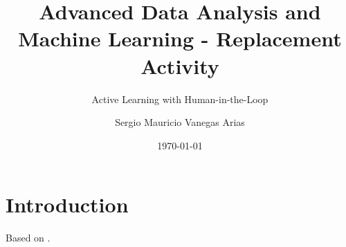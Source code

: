 \documentclass{scrartcl}
\title{Advanced Data Analysis and Machine Learning - Replacement Activity}
\subtitle{Active Learning with Human-in-the-Loop}
\author{Sergio Mauricio Vanegas Arias}
\date{\today}
\begin{document}
  \maketitle

\section{Introduction}

  Based on \textcite{mosqueira2023human}.

\printbibliography
\end{document}
